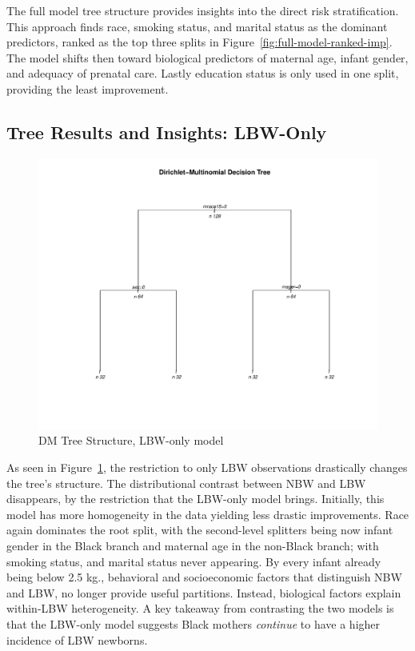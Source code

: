 The full model tree structure provides insights into the direct risk stratification. This approach finds race, smoking status, and marital status as the dominant predictors, ranked as the top three splits in Figure~\ref{fig:full-model-ranked-imp}. The model shifts then toward biological predictors of maternal age, infant gender, and adequacy of prenatal care. Lastly education status is only used in one split, providing the least improvement. 

\subsection{Tree Results and Insights: LBW-Only}
\label{sec:ch3-comparison}

\begin{figure}[H]
  \centering
  \includegraphics[width=1\textwidth]{chapters/chapter3/figures/dm_tree2021_2.pdf}
  \caption{DM Tree Structure, LBW-only model}
  \label{fig:tree_2}
\end{figure}

As seen in Figure~\ref{fig:tree_2}, the restriction to only LBW observations drastically changes the tree's structure. The distributional contrast between NBW and LBW disappears, by the restriction that the LBW-only model brings. Initially, this model has more homogeneity in the data yielding less drastic improvements. Race again dominates the root split, with the second-level splitters being now infant gender in the Black branch and maternal age in the non-Black branch; with smoking status, and marital status never appearing. By every infant already being below 2.5 kg., behavioral and socioeconomic factors that distinguish NBW and LBW, no longer provide useful partitions. Instead, biological factors explain within-LBW heterogeneity. A key takeaway from contrasting the two models is that the LBW-only model suggests Black mothers \textit{continue} to have a higher incidence of LBW newborns. 

